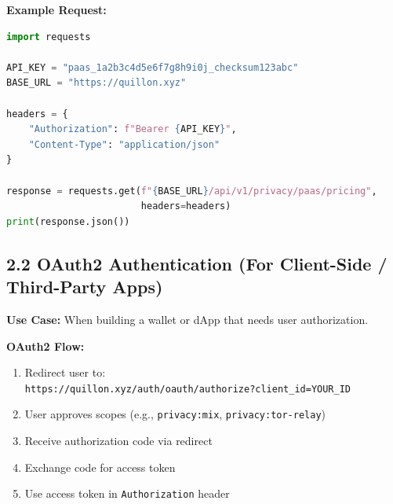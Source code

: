\documentclass[11pt,a4paper]{article}
\begin{document}
\textbf{Example Request:}
\begin{lstlisting}[language=python]
import requests

API_KEY = "paas_1a2b3c4d5e6f7g8h9i0j_checksum123abc"
BASE_URL = "https://quillon.xyz"

headers = {
    "Authorization": f"Bearer {API_KEY}",
    "Content-Type": "application/json"
}

response = requests.get(f"{BASE_URL}/api/v1/privacy/paas/pricing",
                        headers=headers)
print(response.json())
\end{lstlisting}

\subsection{2.2 OAuth2 Authentication (For Client-Side / Third-Party Apps)}

\textbf{Use Case:} When building a wallet or dApp that needs user authorization.

\textbf{OAuth2 Flow:}
\begin{enumerate}
    \item Redirect user to: \\\texttt{https://quillon.xyz/auth/oauth/authorize?client\_id=YOUR\_ID}
    \item User approves scopes (e.g., \texttt{privacy:mix}, \texttt{privacy:tor-relay})
    \item Receive authorization code via redirect
    \item Exchange code for access token
    \item Use access token in \texttt{Authorization} header
\end{enumerate}
\end{document}
